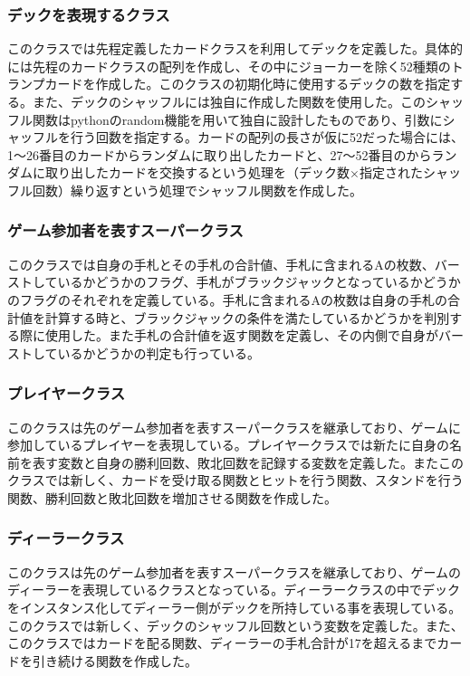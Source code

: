 \subsubsection{デックを表現するクラス}
このクラスでは先程定義したカードクラスを利用してデックを定義した。具体的には先程のカードクラスの配列を作成し、その中にジョーカーを除く52種類のトランプカードを作成した。このクラスの初期化時に使用するデックの数を指定する。また、デックのシャッフルには独自に作成した関数を使用した。このシャッフル関数はpythonのrandom機能を用いて独自に設計したものであり、引数にシャッフルを行う回数を指定する。カードの配列の長さが仮に52だった場合には、1～26番目のカードからランダムに取り出したカードと、27～52番目のからランダムに取り出したカードを交換するという処理を（デック数×指定されたシャッフル回数）繰り返すという処理でシャッフル関数を作成した。

\subsubsection{ゲーム参加者を表すスーパークラス}
このクラスでは自身の手札とその手札の合計値、手札に含まれるAの枚数、バーストしているかどうかのフラグ、手札がブラックジャックとなっているかどうかのフラグのそれぞれを定義している。手札に含まれるAの枚数は自身の手札の合計値を計算する時と、ブラックジャックの条件を満たしているかどうかを判別する際に使用した。また手札の合計値を返す関数を定義し、その内側で自身がバーストしているかどうかの判定も行っている。

\subsubsection{プレイヤークラス}
このクラスは先のゲーム参加者を表すスーパークラスを継承しており、ゲームに参加しているプレイヤーを表現している。プレイヤークラスでは新たに自身の名前を表す変数と自身の勝利回数、敗北回数を記録する変数を定義した。またこのクラスでは新しく、カードを受け取る関数とヒットを行う関数、スタンドを行う関数、勝利回数と敗北回数を増加させる関数を作成した。

\subsubsection{ディーラークラス}
このクラスは先のゲーム参加者を表すスーパークラスを継承しており、ゲームのディーラーを表現しているクラスとなっている。ディーラークラスの中でデックをインスタンス化してディーラー側がデックを所持している事を表現している。このクラスでは新しく、デックのシャッフル回数という変数を定義した。また、このクラスではカードを配る関数、ディーラーの手札合計が17を超えるまでカードを引き続ける関数を作成した。


